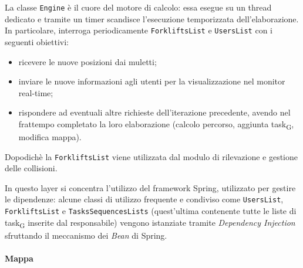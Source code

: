 La classe \texttt{Engine} è il cuore del motore di calcolo: essa esegue su un thread dedicato e tramite un timer scandisce l'esecuzione temporizzata dell'elaborazione. In particolare, interroga periodicamente \texttt{ForkliftsList} e \texttt{UsersList} con i seguenti obiettivi:
\begin{itemize}
	\item ricevere le nuove posizioni dai muletti;
	\item inviare le nuove informazioni agli utenti per la visualizzazione nel monitor real-time;
	\item rispondere ad eventuali altre richieste dell'iterazione precedente, avendo nel frattempo completato la loro elaborazione (calcolo percorso, aggiunta task\textsubscript{G}, modifica mappa).
\end{itemize}
Dopodichè la \texttt{ForkliftsList} viene utilizzata dal modulo di rilevazione e gestione delle collisioni.

In questo layer si concentra l'utilizzo del framework Spring, utilizzato per gestire le dipendenze: alcune classi di utilizzo frequente e condiviso come \texttt{UsersList}, \texttt{ForkliftsList} e \texttt{TasksSequencesLists} (quest'ultima contenente tutte le liste di task\textsubscript{G} inserite dal responsabile) vengono istanziate tramite \textit{Dependency Injection} sfruttando il meccanismo dei \textit{Bean} di Spring.




\paragraph{Mappa}
\subparagraph*{ }

